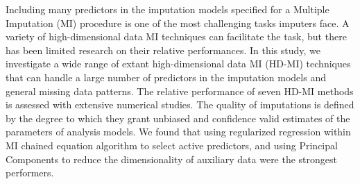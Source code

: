
Including many predictors in the imputation models specified for a Multiple Imputation (MI) 
procedure is one of the most challenging tasks imputers face.
A variety of high-dimensional data MI techniques can facilitate the task, but there has been 
limited research on their relative performances.
In this study, we investigate a wide range of extant high-dimensional data MI (HD-MI) techniques 
that can handle a large number of predictors in the imputation models and general missing data 
patterns.
The relative performance of seven HD-MI methods is assessed with extensive numerical studies.
The quality of imputations is defined by the degree to which they grant unbiased and confidence 
valid estimates of the parameters of analysis models.
We found that using regularized regression within MI chained equation algorithm to select active 
predictors, and using Principal Components to reduce the dimensionality of auxiliary data were 
the strongest performers.
